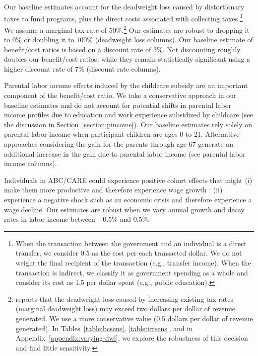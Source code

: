 Our baseline estimates account for the deadweight loss caused by distortionary taxes to fund programs, plus the direct costs associated with collecting taxes.\footnote{When the transaction between the government and an individual is a direct transfer, we consider 0.5 as the cost per each transacted dollar. We do not weight the final recipient of the transaction (e.g., transfer income). When the transaction is indirect, we classify it as government spending as a whole and consider its cost as 1.5 per dollar spent (e.g., public education).} We assume a marginal tax rate of $50\%$.\footnote{\citet{Feldstein_1999_REStat} reports that the deadweight loss caused by increasing existing tax rates (marginal deadweight loss) may exceed two dollars per dollar of revenue generated. We use a more conservative value (0.5 dollars per dollar of revenue generated). In Tables~\ref{table:bcsens}, \ref{table:irrsens}, and in  Appendix~\ref{appendix:varying-dwl}, we explore the robustness of this decision and find little sensitivity.} Our estimates are robust to dropping it to $0\%$ or doubling it to $100\%$ (deadweight loss columns). Our baseline estimate of benefit/cost ratios is based on a discount rate of $3\%$. Not discounting roughly doubles our benefit/cost ratios, while they remain statistically significant using a higher discount rate of $7\%$ (discount rate columns).

Parental labor income effects induced by the childcare subsidy are an important component of the benefit/cost ratio. We take a conservative approach in our baseline estimates and do not account for potential shifts in parental labor income profiles due to education and work experience subsidized by childcare (see the discussion in Section~\ref{section:pincome}). Our baseline estimates rely solely on parental labor income when participant children are ages 0 to 21. Alternative approaches considering the gain for the parents through age 67 generate an additional increase in the gain due to parental labor income (see parental labor income columns).

Individuals in ABC/CARE could experience positive cohort effects that might (i) make them more productive and therefore experience wage growth \citep{Lagakos_Moll_etal_2016_LifeCycle_NBER}; (ii) experience a negative shock such as an economic crisis and therefore experience a wage decline. Our estimates are robust when we vary annual growth and decay rates in labor income between $-0.5\%$ and $0.5\%$.


